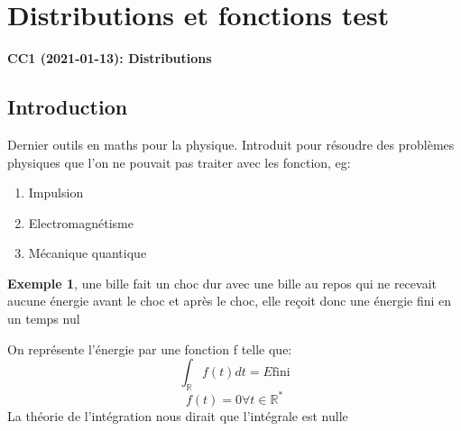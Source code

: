 \documentclass[12pt,a4paper]{report}
\author{Malo Kerebel}
\begin{document}
\begin{titlepage}

\end{titlepage}

\tableofcontents

\chapter{Distributions et fonctions test}
\begin{center}
\textbf{CC1 (2021-01-13): Distributions}
\end{center}

\section{Introduction}

Dernier outils en maths pour la physique. Introduit pour résoudre des problèmes physiques que l'on ne pouvait pas traiter avec les fonction, eg:
\begin{enumerate}
	\item Impulsion
	\item Electromagnétisme
	\item Mécanique quantique
\end{enumerate}

\textbf{Exemple 1}, une bille fait un choc dur avec une bille au repos qui ne recevait aucune énergie avant le choc et après le choc, elle reçoit donc une énergie fini en un temps nul

On représente l'énergie par une fonction f telle que:
\[
	\int_{\mathbb{R}} f(t) dt = E \text{fini}
\]
\[
	f(t) = 0 \forall t \in \mathbb{R}^*
\]
La théorie de l'intégration nous dirait que l'intégrale est nulle
\end{document}
